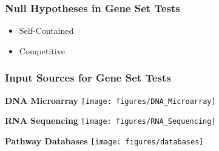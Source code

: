 \documentclass[9pt,t]{beamer}
\begin{document}
%

\begin{frame}
\frametitle{Null Hypotheses in Gene Set Tests}
\begin{itemize}
	\item Self-Contained
	\item Competitive
\end{itemize}
\end{frame}

\begin{frame}
	\frametitle{Input Sources for Gene Set Tests}
	\vspace{0.1cm}
	\begin{minipage}[t]{0.3\textwidth}
	\centering
	{\color{oxygenpurple}\textbf{DNA Microarray}}
	\texttt{[image: figures/DNA\_Microarray]}
	\end{minipage}
	\hspace{0.4cm}
	\begin{minipage}[t]{0.3\textwidth}
	\centering
	{\color{oxygenpurple}\textbf{RNA Sequencing}}
	\vspace{-0.5cm}
	\texttt{[image: figures/RNA\_Sequencing]}
	\end{minipage}
	\hspace{0.2cm}
	\begin{minipage}[t]{0.3\textwidth}
	\centering
	{\color{oxygenpurple}\textbf{Pathway Databases}}
	\vspace{-0.5cm}
	\texttt{[image: figures/databases]}
	\end{minipage}
\end{frame}
\end{document}
